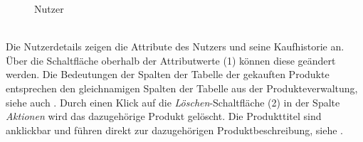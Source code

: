 \begin{figure}[h!]
  \centering
  \caption{Nutzer}
  \label{fig:Nutzer}
\end{figure}
\text{}\vspace*{-1em}\\
Die Nutzerdetails  zeigen die Attribute des Nutzers und seine Kaufhistorie an. Über die Schaltfläche oberhalb der Attributwerte (1) können diese ge\-än\-dert werden. Die Bedeutungen der Spalten der Tabelle der gekauften Produkte entsprechen den gleichnamigen Spalten der Tabelle aus der Produkteverwaltung, siehe auch . Durch einen Klick auf die \textit{Löschen}-Schaltfläche (2) in der Spalte \textit{Aktionen} wird das dazugehörige Produkt gelöscht. Die Produkttitel sind anklickbar und führen direkt zur dazugehörigen Produktbeschreibung, siehe .

